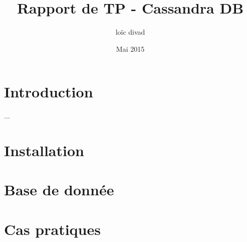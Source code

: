 \documentclass{article}
\title{Rapport de TP - Cassandra DB}
\author{loïc divad}
\date{Mai 2015}
\begin{document}
\maketitle

\section{Introduction}
...

\section{Installation}





\section{Base de donnée}



\section{Cas pratiques}


\end{document}
